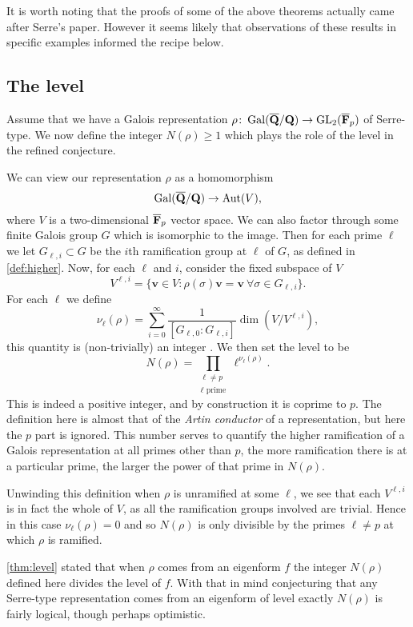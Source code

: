 \documentclass[a4paper,12pt]{article}
\begin{document}
It is worth noting that the proofs of some of the above theorems actually came after Serre's paper.
However it seems likely that observations of these results in specific examples informed the recipe below.


\subsection{The level}\label{subsec:level}
Assume that we have a Galois representation $\rho\colon \operatorname{Gal}(\overline{\mathbf{Q}}/\mathbf{Q}) \to \operatorname{GL}_2(\overline{\mathbf{F}}_p)$ of Serre-type.
We now define the integer $N(\rho) \ge 1$ which plays the role of the level in the refined conjecture.

We can view our representation $\rho$ as a homomorphism
\[
\operatorname{Gal}(\overline{\mathbf{Q}}/\mathbf{Q}) \to \operatorname{Aut}(V),
\]
where $V$ is a two-dimensional $\overline{\mathbf{F}}_p$ vector space.
We can also factor through some finite Galois group $G$ which is isomorphic to the image.
Then for each prime $\ell$ we let $G_{\ell,i}\subset G$ be the $i$th ramification group at $\ell$ of $G$, as defined in \cref{def:higher}.
Now, for each $\ell$ and $i$, consider the fixed subspace of $V$
\[
V^{\ell,i} = \{\mathbf{v}\in V : \rho(\sigma) \mathbf{v} = \mathbf{v}\ \forall \sigma \in G_{\ell,i}\}.
\]
For each $\ell$ we define
\[
\nu_\ell(\rho) = \sum_{i = 0}^{\infty} \frac{1}{[G_{\ell,0} : G_{\ell,i}]} \dim(V/V^{\ell,i}),
\]
this quantity is (non-trivially) an integer \cite[p. 99]{SerreLF}.
We then set the level to be
\[
N(\rho) = \prod_{\substack{\ell \ne p\\ \ell\text{ prime}}} \ell^{\nu_\ell(\rho)}.
\]
This is indeed a positive integer, and by construction it is coprime to $p$.
The definition here is almost that of the \emph{Artin conductor} of a representation, but here the $p$ part is ignored.
This number serves to quantify the higher ramification of a Galois representation at all primes other than $p$, the more ramification there is at a particular prime, the larger the power of that prime in $N(\rho)$.

\begin{rmk}\label{rmk:unram}
Unwinding this definition when $\rho$ is unramified at some $\ell$, we see that each $V^{\ell,i}$ is in fact the whole of $V$, as all the ramification groups involved are trivial.
Hence in this case $\nu_\ell(\rho) = 0$ and so $N(\rho)$ is only divisible by the primes $\ell \ne p$ at which $\rho$ is ramified.
\end{rmk}

\cref{thm:level} stated that when $\rho$ comes from an eigenform $f$ the integer $N(\rho)$ defined here divides the level of $f$.
With that in mind conjecturing that any Serre-type representation comes from an eigenform of level exactly $N(\rho)$ is fairly logical, though perhaps optimistic.
\end{document}
